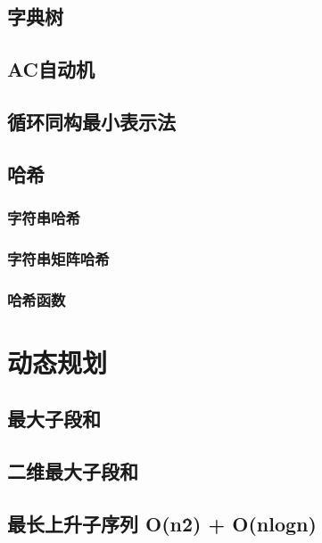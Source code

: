 \documentclass[a4paper, 12pt]{article}
\begin{document}
\subsection{字典树}


\subsection{AC自动机}


\subsection{循环同构最小表示法}


\subsection{哈希}
\subsubsection{字符串哈希}

\subsubsection{字符串矩阵哈希}

\subsubsection{哈希函数}


\section{动态规划}
\subsection{最大子段和}

\subsection{二维最大子段和}

\subsection{最长上升子序列 O(n\^2) + O(nlogn)}

\end{document}
